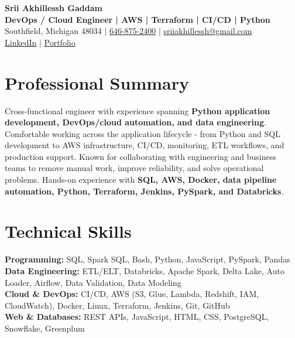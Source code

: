 \documentclass[letterpaper,10pt]{article}
\begin{document}
\fontsize{9.35pt}{10.45pt}\selectfont

\begin{center}
    {\LARGE \textbf{Srii Akhillessh Gaddam}} \\[-1pt]
    \textbf{DevOps / Cloud Engineer | AWS | Terraform | CI/CD | Python} \\[2pt]
    Southfield, Michigan 48034 $|$
    \href{tel:6468752400}{646-875-2400} $|$
    \href{mailto:sriiakhillessh@gmail.com}{sriiakhillessh@gmail.com} \\[1pt]
    \href{https://www.linkedin.com/in/srii-akhiilessh-gaddam-b48668191/}{LinkedIn} $|$
    \href{https://sriiakhillesshg.github.io/portfolio/}{Portfolio}
\end{center}
\vspace{-8pt}

\section{Professional Summary}
\small{Cross-functional engineer with experience spanning \textbf{Python application development, DevOps/cloud automation, and data engineering}. Comfortable working across the application lifecycle - from Python and SQL development to AWS infrastructure, CI/CD, monitoring, ETL workflows, and production support. Known for collaborating with engineering and business teams to remove manual work, improve reliability, and solve operational problems. Hands-on experience with \textbf{SQL, AWS, Docker, data pipeline automation, Python, Terraform, Jenkins, PySpark, and Databricks}.}

\section{Technical Skills}
\small{
\textbf{Programming:} SQL, Spark SQL, Bash, Python, JavaScript, PySpark, Pandas \\
\textbf{Data Engineering:} ETL/ELT, Databricks, Apache Spark, Delta Lake, Auto Loader, Airflow, Data Validation, Data Modeling \\
\textbf{Cloud \& DevOps:} CI/CD, AWS (S3, Glue, Lambda, Redshift, IAM, CloudWatch), Docker, Linux, Terraform, Jenkins, Git, GitHub \\
\textbf{Web \& Databases:} REST APIs, JavaScript, HTML, CSS, PostgreSQL, Snowflake, Greenplum
}
\end{document}
